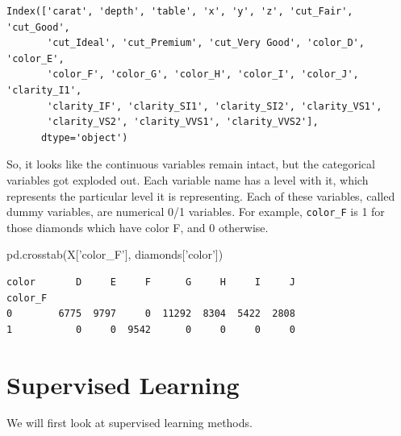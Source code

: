\documentclass[
  letterpaper,
]{scrbook}
\newenvironment{Shaded}{\begin{snugshade}}{\end{snugshade}}
\newcommand{\NormalTok}[1]{#1}
\newcommand{\StringTok}[1]{\textcolor[rgb]{0.31,0.60,0.02}{#1}}
\begin{document}
\begin{verbatim}
Index(['carat', 'depth', 'table', 'x', 'y', 'z', 'cut_Fair', 'cut_Good',
       'cut_Ideal', 'cut_Premium', 'cut_Very Good', 'color_D', 'color_E',
       'color_F', 'color_G', 'color_H', 'color_I', 'color_J', 'clarity_I1',
       'clarity_IF', 'clarity_SI1', 'clarity_SI2', 'clarity_VS1',
       'clarity_VS2', 'clarity_VVS1', 'clarity_VVS2'],
      dtype='object')
\end{verbatim}

So, it looks like the continuous variables remain intact, but the categorical variables got exploded out. Each
variable name has a level with it, which represents the particular level it is representing. Each of these
variables, called dummy variables, are numerical 0/1 variables. For example, \texttt{color\_F} is 1 for those diamonds which have color F, and 0 otherwise.

\begin{Shaded}
\begin{Highlighting}[]
\NormalTok{pd.crosstab(X[}\StringTok{'color_F'}\NormalTok{], diamonds[}\StringTok{'color'}\NormalTok{])}
\end{Highlighting}
\end{Shaded}

\begin{verbatim}
color       D     E     F      G     H     I     J
color_F                                           
0        6775  9797     0  11292  8304  5422  2808
1           0     0  9542      0     0     0     0
\end{verbatim}

\hypertarget{supervised-learning}{%
\section{Supervised Learning}\label{supervised-learning}}

We will first look at supervised learning methods.
\end{document}
